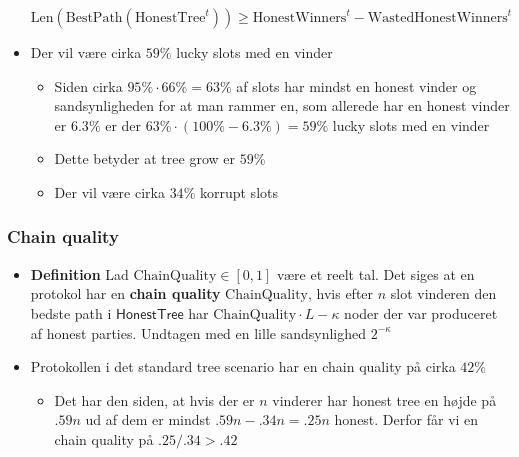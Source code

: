 \documentclass[a4, english]{article}
\begin{document}
\begin{itemize}
\begin{equation*}
    \text{Len}(\text{BestPath}(\text{HonestTree}^t)) \geq \text{HonestWinners} ^t -\text{WastedHonestWinners}^t
  \end{equation*}
  \item Der vil være cirka $59\%$ lucky slots med en vinder
  \begin{itemize}
    \item Siden cirka $95\% \cdot 66\% = 63\%$ af slots har mindst en honest vinder og sandsynligheden for at man rammer en, som allerede har en honest vinder er $6.3\%$ er der $63\% \cdot (100\%-6.3\%) = 59\%$ lucky slots med en vinder
    \item Dette betyder at tree grow er $59\%$ 
    \item Der vil være cirka $34\%$ korrupt slots 
  \end{itemize}
\end{itemize}
  
\subsubsection{Chain quality}
\begin{itemize}
  \item \textbf{Definition} Lad $\text{ChainQuality} \in [0,1]$ være et reelt tal. Det siges at en protokol har en \textbf{chain quality} $\text{ChainQuality}$, hvis efter $n$ slot vinderen den bedste path i $\mathsf{HonestTree}$ har $\text{ChainQuality} \cdot L - \kappa$ noder der var produceret af honest parties. Undtagen med en lille sandsynlighed $2^{-\kappa}$ 
  \item Protokollen i det standard tree scenario har en chain quality på cirka $42\%$ 
  \begin{itemize}
  	\item Det har den siden, at hvis der er $n$ vinderer har honest tree en højde på $.59n$ ud af dem er mindst $.59n-.34n=.25n$ honest. Derfor får vi en chain quality på $.25/.34>.42$ 
  \end{itemize}
\end{itemize}
\end{document}
